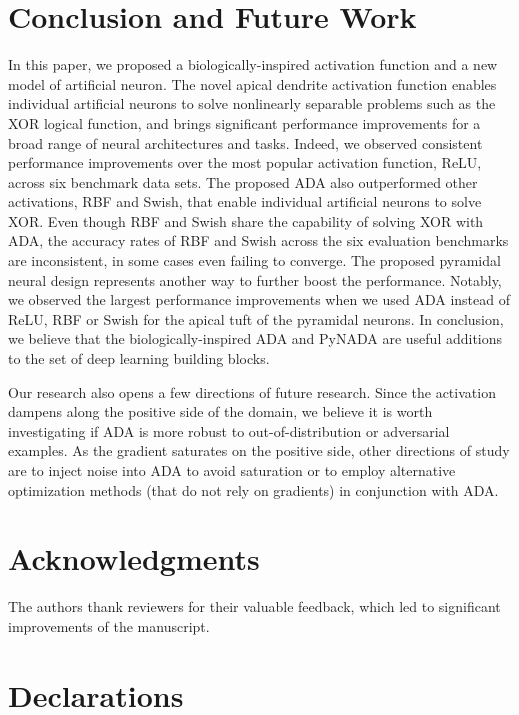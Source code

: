 \documentclass[pdflatex,sn-mathphys]{sn-jnl}
\theoremstyle{thmstyleone}
\theoremstyle{thmstyletwo}\newtheorem{example}{Example}\newtheorem{remark}{Remark}
\theoremstyle{thmstylethree}\newtheorem{definition}{Definition}\DeclareMathOperator{\sinc}{sinc}
\begin{document}
\section{Conclusion and Future Work}
\label{sec_conclusion}

In this paper, we proposed a biologically-inspired activation function and a new model of artificial neuron. The novel apical dendrite activation function  enables individual artificial neurons to solve nonlinearly separable problems such as the XOR logical function, and  brings significant performance improvements for a broad range of neural architectures and tasks. Indeed, we observed consistent performance improvements over the most popular activation function, ReLU, across six benchmark data sets. The proposed ADA also outperformed other activations, RBF and Swish, that enable individual artificial neurons to solve XOR. Even though RBF and Swish share the capability of solving XOR with ADA, the accuracy rates of RBF and Swish across the six evaluation benchmarks are inconsistent, in some cases even failing to converge. 
The proposed pyramidal neural design represents another way to further boost the performance. Notably, we observed the largest performance improvements when we used ADA instead of ReLU, RBF or Swish for the apical tuft of the pyramidal neurons. In conclusion, we believe that the biologically-inspired ADA and PyNADA are useful additions to the set of deep learning building blocks. 

Our research also opens a few directions of future research. Since the activation dampens along the positive side of the domain, we believe it is worth investigating if ADA is more robust to out-of-distribution or adversarial examples. As the gradient saturates on the positive side, other directions of study are to inject noise into ADA to avoid saturation \citep{Gulcehre-ICML-2016} or to employ alternative optimization methods (that do not rely on gradients) in conjunction with ADA. 

\section{Acknowledgments}

The authors thank reviewers for their valuable feedback, which led to significant improvements of the manuscript.

\section{Declarations}
\end{document}
